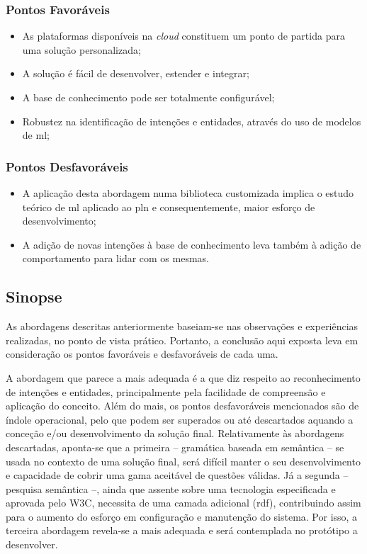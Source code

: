 \subsubsection*{Pontos Favoráveis}
\begin{itemize}
    \item
    {
        As plataformas disponíveis na \textit{cloud} constituem um ponto de partida para uma solução personalizada;
    }
    \item
    {
        A solução é fácil de desenvolver, estender e integrar;
    }
    \item
    {
        A base de conhecimento pode ser totalmente configurável;
    }
    \item
    {
        Robustez na identificação de intenções e entidades, através do uso de modelos de \gls{ml};
    }
\end{itemize}

\subsubsection*{Pontos Desfavoráveis}
\begin{itemize}
    \item
    {
        A aplicação desta abordagem numa biblioteca customizada implica o estudo teórico de \gls{ml} aplicado ao \gls{pln} e consequentemente, maior esforço de desenvolvimento;
    }
    \item
    {
        A adição de novas intenções à base de conhecimento leva também à adição de comportamento para lidar com os mesmas.
    }
\end{itemize}

\subsection{Sinopse}
As abordagens descritas anteriormente baseiam-se nas observações e experiências realizadas, no ponto de vista prático. Portanto, a conclusão aqui exposta leva em consideração os pontos favoráveis e desfavoráveis de cada uma.

A abordagem que parece a mais adequada é a que diz respeito ao reconhecimento de intenções e entidades, principalmente pela facilidade de compreensão e aplicação do conceito. Além do mais, os pontos desfavoráveis mencionados são de índole operacional, pelo que podem ser superados ou até descartados aquando a conceção e/ou desenvolvimento da solução final. Relativamente às abordagens descartadas, aponta-se que a primeira -- gramática baseada em semântica -- se usada no contexto de uma solução final, será difícil manter o seu desenvolvimento e capacidade de cobrir uma gama aceitável de questões válidas. Já a segunda -- pesquisa semântica --, ainda que assente sobre uma tecnologia especificada e aprovada pelo W3C, necessita de uma camada adicional (\gls{rdf}), contribuindo assim para o aumento do esforço em configuração e manutenção do sistema. Por isso, a terceira abordagem revela-se a mais adequada e será contemplada no protótipo a desenvolver.

